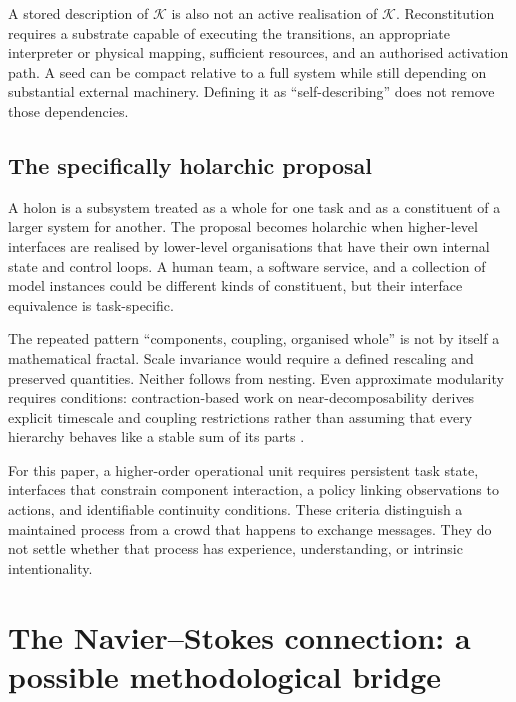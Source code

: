 \documentclass[11pt,a4paper]{article}
\theoremstyle{definition}
\theoremstyle{remark}
\newcommand{\calK}{\mathcal{K}}
\begin{document}
A stored description of $\calK$ is also not an active realisation of $\calK$. Reconstitution requires a substrate capable of executing the transitions, an appropriate interpreter or physical mapping, sufficient resources, and an authorised activation path. A seed can be compact relative to a full system while still depending on substantial external machinery. Defining it as ``self-describing'' does not remove those dependencies.

\subsection{The specifically holarchic proposal}
A holon is a subsystem treated as a whole for one task and as a constituent of a larger system for another. The proposal becomes holarchic when higher-level interfaces are realised by lower-level organisations that have their own internal state and control loops. A human team, a software service, and a collection of model instances could be different kinds of constituent, but their interface equivalence is task-specific.

The repeated pattern ``components, coupling, organised whole'' is not by itself a mathematical fractal. Scale invariance would require a defined rescaling and preserved quantities. Neither follows from nesting. Even approximate modularity requires conditions: contraction-based work on near-decomposability derives explicit timescale and coupling restrictions rather than assuming that every hierarchy behaves like a stable sum of its parts \citep{bousquet}.

For this paper, a higher-order operational unit requires persistent task state, interfaces that constrain component interaction, a policy linking observations to actions, and identifiable continuity conditions. These criteria distinguish a maintained process from a crowd that happens to exchange messages. They do not settle whether that process has experience, understanding, or intrinsic intentionality.

\section{The Navier--Stokes connection: a possible methodological bridge}\label{sec:ns}
\end{document}

